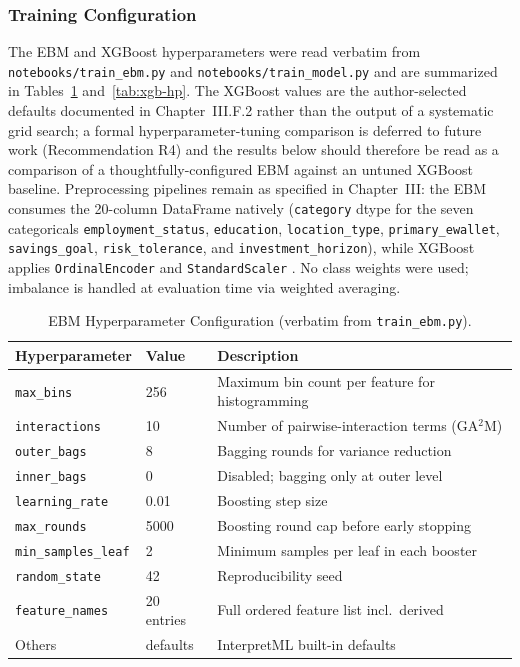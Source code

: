 \documentclass[journal]{./IEEE/IEEEtran}
\begin{document}
\subsubsection{Training Configuration}

The EBM and XGBoost hyperparameters were read verbatim from \texttt{notebooks/train\_ebm.py} and \texttt{notebooks/train\_model.py} and are summarized in Tables~\ref{tab:ebm-hp} and~\ref{tab:xgb-hp}. The XGBoost values are the author-selected defaults documented in Chapter~III.F.2 rather than the output of a systematic grid search; a formal hyperparameter-tuning comparison is deferred to future work (Recommendation R4) and the results below should therefore be read as a comparison of a thoughtfully-configured EBM against an untuned XGBoost baseline. Preprocessing pipelines remain as specified in Chapter~III: the EBM consumes the 20-column DataFrame natively (\texttt{category} dtype for the seven categoricals \texttt{employment\_status}, \texttt{education}, \texttt{location\_type}, \texttt{primary\_ewallet}, \texttt{savings\_goal}, \texttt{risk\_tolerance}, and \texttt{investment\_horizon}), while XGBoost applies \texttt{OrdinalEncoder} and \texttt{StandardScaler} \cite{ref74}. No class weights were used; imbalance is handled at evaluation time via weighted averaging.

\begin{table}[h]
    \centering
    \caption{EBM Hyperparameter Configuration (verbatim from \texttt{train\_ebm.py}).}
    \label{tab:ebm-hp}
    \footnotesize
    \begin{tabular}{|l|l|p{4cm}|}
        \hline
        \textbf{Hyperparameter} & \textbf{Value} & \textbf{Description} \\
        \hline
        \texttt{max\_bins} & 256 & Maximum bin count per feature for histogramming \\
        \texttt{interactions} & 10 & Number of pairwise-interaction terms (GA$^2$M) \\
        \texttt{outer\_bags} & 8 & Bagging rounds for variance reduction \\
        \texttt{inner\_bags} & 0 & Disabled; bagging only at outer level \\
        \texttt{learning\_rate} & 0.01 & Boosting step size \\
        \texttt{max\_rounds} & 5000 & Boosting round cap before early stopping \\
        \texttt{min\_samples\_leaf} & 2 & Minimum samples per leaf in each booster \\
        \texttt{random\_state} & 42 & Reproducibility seed \\
        \texttt{feature\_names} & 20 entries & Full ordered feature list incl.\ derived \\
        Others & defaults & InterpretML built-in defaults \cite{ref15} \\
        \hline
    \end{tabular}
\end{table}
\end{document}
